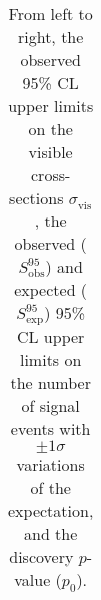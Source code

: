 \begin{table}[!ht]
\begin{center}
\begin{tabular*}{\textwidth}{@{\extracolsep{\fill}}lcccc}
    \end{tabular*}
    \end{center}
    \caption[Model independent limits]{From left to right, the observed 95\% CL upper limits on the visible cross-sections $\sigma^{}_\textrm{vis}$, 
    the observed ($S^{95}_\mathrm{obs}$) and expected ($S^{95}_\mathrm{exp}$) 95\% CL upper limits on the number of 
    signal events with $\pm1 \sigma$ variations of the expectation, and the discovery $p$-value ($p_0$).}
    \label{tab:1Lbbrun2:modelindependent}
    \end{table}
    